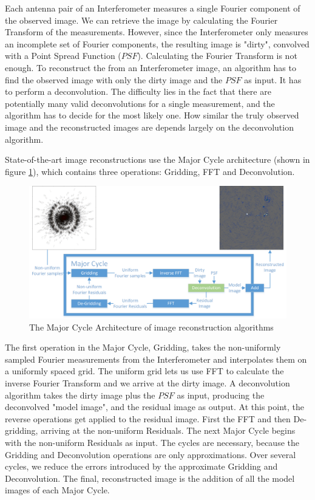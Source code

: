 Each antenna pair of an Interferometer measures a single Fourier component of the observed image. We can retrieve the image by calculating the Fourier Transform of the measurements. However, since the Interferometer only measures an incomplete set of Fourier components, the resulting image is "dirty", convolved with a Point Spread Function ($PSF$). Calculating the Fourier Transform is not enough. To reconstruct the from an Interferometer image, an algorithm has to find the observed image with only the dirty image and the $PSF$ as input. It has to perform a deconvolution. The difficulty lies in the fact that there are potentially many valid deconvolutions for a single measurement, and the algorithm has to decide for the most likely one. How similar the truly observed image and the reconstructed images are depends largely on the deconvolution algorithm.

State-of-the-art image reconstructions use the Major Cycle architecture (shown in figure \ref{hypo:major3}), which contains three operations: Gridding, FFT and Deconvolution.

\begin{figure}[h]
	\centering
	\includegraphics[width=0.80\linewidth]{./chapters/02.hypo/Major-Minor3.png}
	\caption{The Major Cycle Architecture of image reconstruction algorithms}
	\label{hypo:major3}
\end{figure}

The first operation in the Major Cycle, Gridding, takes the non-uniformly sampled Fourier measurements from the Interferometer and interpolates them on a uniformly spaced grid. The uniform grid lets us use FFT to calculate the inverse Fourier Transform and we arrive at the dirty image. A deconvolution algorithm takes the dirty image plus the $PSF$ as input, producing the deconvolved "model image", and the residual image as output. At this point, the reverse operations get applied to the residual image. First the FFT and then De-gridding, arriving at the non-uniform Residuals. The next Major Cycle begins with the non-uniform Residuals as input. The cycles are necessary, because the Gridding and Deconvolution operations are only approximations. Over several cycles, we reduce the errors introduced by the approximate Gridding and Deconvolution. The final, reconstructed image is the addition of all the model images of each Major Cycle. 

